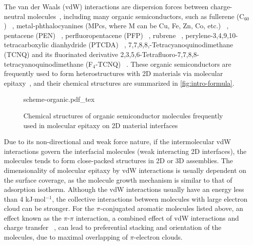 The van der Waals (vdW) interactions are dispersion forces between
charge-neutral molecules~\cite{Israelachvili_2011_book}, including
many organic semiconductors, such as fullerene (C\(_{\text{60}}\))
~\cite{Corso_2004_C60_hBN,Kim_2015_c60_gr,Chen_2016_c60_mos2},
metal-phthalo\-cyanines (MPcs, where M can be Cu, Fe, Zn, Co, etc.)
~\cite{Xiao_2013_jacs_CuPc_gr,Wang_2010_selec_F16_gr,Zhang_2011_FePc_gr,Hamalainen_2012_CoPc_gr_Ir,Ying_Mao_2011_ge_clAlPc,Ogawa_2013_AlCiPc_gr,Pak_2015_CuPc_MoS2,Avvisati_2017_FePc_intercal,Iannuzzi_2014_MPc_hBN_Rh},
pentacene (PEN)
~\cite{Lee_2011_pentacene,Jariwala_2016_Mos2_pentacene,Shen_2017_DFT_mos2_pent,Kim_2016_trap_Mos2_pent,Nguyen_2015_pent_gr_wett,Betti_2007_orien_pentacene},
perfluoropentacene (PFP)
~\cite{Salzmann_2012_fpen_gr,Breuer_2016_acnene_mos2}, rubrene
~\cite{Lee_2014_rubene_hBN}, perylene-3,4,9,10-tetra\-carboxylic
dianhydride (PTCDA)
~\cite{Wang_2009_STM_PTCDA_Gr,Tian_2010_PTCDA_gr,Huang_2009_PTCDA_gr,Meissner_2012_PTCDA_BLG},
7,7,8,8,-Tetra\-cyanoquino\-dimethane (TCNQ) and its fluorinated
derivative 2,3,5,6-Tetra\-fluoro-7,7,8,8-tetra\-cyanoquino\-dimethane
(F\(_{\text{4}}\)-TCNQ)
~\cite{Chen_2007_tcnq_gr_transfer,Hong_2013_ftcnq_gr,Stradi_2014_TCNQ_gr_Ru,Tsai_2015_TCNQ_gr_hbn}. These
organic semiconductors are frequently used to form heterostructures
with 2D materials via molecular epitaxy~\cite{Hara_1989_ME}, and their chemical structures are summarized in \autoref{fig:intro-formula}.

\begin{figure}[h]
  \centering
  {scheme-organic.pdf_tex}
  \caption{%
    \label{fig:intro-formula}
    Chemical structures of organic semiconductor molecules frequently
    used in molecular epitaxy on 2D material interfaces }
\end{figure}

Due to its non-directional and weak force nature, if the
intermolecular vdW interactions govern the interfacial molecules (weak
interacting 2D interfaces), the molecules tends to form close-packed
structures in 2D or 3D assemblies. The dimensionality of molecular
epitaxy by vdW interactions is usually dependent on the surface
coverage, as the molecule growth mechanism is similar to that of
adsorption isotherm. Although the vdW interactions usually have an
energy less than 4 kJ\(\cdot\)mol\(^{-1}\), the collective
interactions between molecules with large electron cloud can be
stronger. For the \(\pi\)-conjugated aromatic molecules listed above,
an effect known as the \(\pi\)-\(\pi\) interaction, a combined effect
of vdW interactions and charge transfer ~\cite{Hunter_1990_pi,Ortmann_2005_long_range}, can
lead to preferential stacking and orientation of the molecules, due to
maximal overlapping of \(\pi\)-electron clouds.



